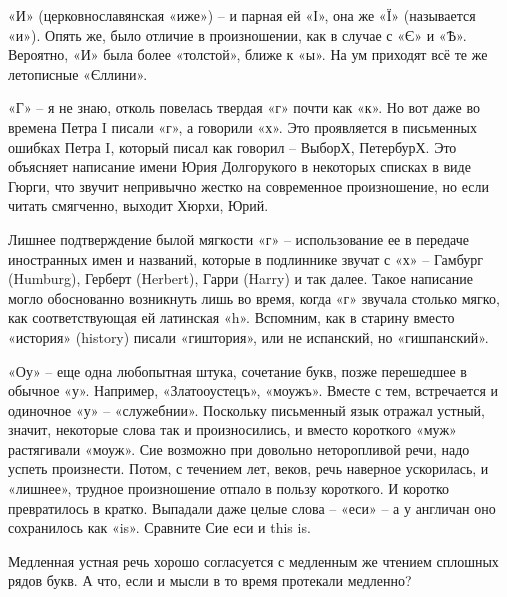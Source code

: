 \documentclass[a5paper,11pt,openany]{article}
\begin{document}
«И» (церковнославянская «иже») – и парная ей «І», она же «Ї» (называется «и»). Опять же, было отличие в произношении, как в случае с «Є» и «Ѣ». Вероятно, «И» была более «толстой», ближе к «ы». На ум приходят всё те же летописные «Єллини».

«Г» – я не знаю, отколь повелась твердая «г» почти как «к». Но вот даже во времена Петра I писали «г», а говорили «х». Это проявляется в письменных ошибках Петра I, который писал как говорил – ВыборХ, ПетербурХ. Это объясняет написание имени Юрия Долгорукого в некоторых списках в виде Гюрги, что звучит непривычно жестко на современное произношение, но если читать смягченно, выходит Хюрхи, Юрий.

Лишнее подтверждение былой мягкости «г» – использование ее в передаче иностранных имен и названий, которые в подлиннике звучат с «х» – Гамбург (Humburg), Герберт (Herbert), Гарри (Harry) и так далее. Такое написание могло обоснованно возникнуть лишь во время, когда «г» звучала столько мягко, как соответствующая ей латинская «h». Вспомним, как в старину вместо «история» (history) писали «гиштория», или не испанский, но «гишпанский».

«Оу» – еще одна любопытная штука, сочетание букв, позже перешедшее в обычное «у». Например, «Златооустецъ», «моужъ». Вместе с тем, встречается и одиночное «у» – «служебнии». Поскольку письменный язык отражал устный, значит, некоторые слова так и произносились, и вместо короткого «муж» растягивали «моуж». Сие возможно при довольно неторопливой речи, надо успеть произнести. Потом, с течением лет, веков, речь наверное ускорилась, и «лишнее», трудное произношение отпало в пользу короткого. И коротко превратилось в кратко. Выпадали даже целые слова – «еси» – а у англичан оно сохранилось как «is». Сравните Сие еси и this is. 

Медленная устная речь хорошо согласуется с медленным же чтением сплошных рядов букв. А что, если и мысли в то время протекали медленно? 




\newpage


\newpage




%

\begin{thebibliography}{999}

\end{thebibliography}
\end{document}
